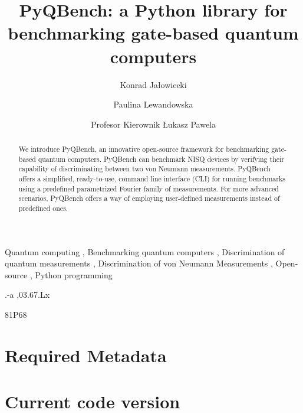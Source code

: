 \documentclass[preprint,12pt, a4paper]{elsarticle}
\newcommand{\1}{{\rm 1\hspace{-0.9mm}l}}
\begin{document}
\begin{frontmatter}

\title{PyQBench: a Python library for benchmarking gate-based quantum computers}

\author{Konrad Jałowiecki}

\author{Paulina Lewandowska}
\author{Profesor Kierownik \L ukasz Pawela}

\address{Institute of Theoretical and Applied Informatics, Polish Academy
	of Sciences, Ba{\l}tycka 5, 44-100 Gliwice, Poland}

\begin{abstract}
We introduce PyQBench, an innovative open-source framework for benchmarking 
gate-based quantum computers. PyQBench can benchmark NISQ devices by verifying their capability of
discriminating between two von Neumann measurements. PyQBench offers a simplified, ready-to-use,
command line interface (CLI) for running benchmarks using a predefined parametrized Fourier
family of measurements. For more advanced scenarios, PyQBench offers a way of employing user-defined
measurements instead of predefined ones.

\end{abstract}

\begin{keyword}
Quantum computing \sep
Benchmarking quantum computers \sep 
Discrimination of quantum measurements \sep 
Discrimination of von Neumann Measurements \sep
Open-source \sep
Python programming

.-a \sep 03.67.Lx
		
\MSC 81P68

\end{keyword}

\end{frontmatter}

\section*{Required Metadata}
\label{}

\section*{Current code version}
\label{}
\end{document}

